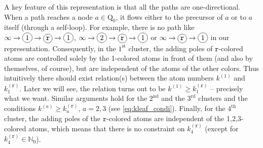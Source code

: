 \documentclass[12pt,a4paper]{article}
\renewcommand{\(}{\left(}
\renewcommand{\)}{\right)}
\newcommand*\circled[1]{\tikz[baseline=(char.base)]{
		\node[shape=circle,draw,inner sep=2pt] (char) {#1};}}
\renewcommand{\(}{\left(}
\renewcommand{\)}{\right)}
\begin{document}
A key feature of this representation is that all the paths are one-directional. 
When a path reaches a node $a\in \mathrm{Q}_0$, it flows either to the precursor of $a$ or to $a$ itself (through a self-loop). 
For example, there is no path like {\small $\infty\to \circled{1}\to \circled{\texttt{r}}\to\circled{1}$, $\infty\to \circled{2}\to \circled{\texttt{r}}\to\circled{1}$ }or {\small $\infty\to \circled{\texttt{r}}\to\circled{1}$} in our representation. 
Consequently, in the $1^{\textrm{st}}$ cluster, the adding poles of $\texttt{r}$-colored atoms are controlled solely by the 1-colored atoms in front of them (and also by themselves, of course), but are independent of the atoms of the other colors. 
Thus intuitively there should exist relation(s) between the atom numbers $k^{(1)}$ and $k^{(\texttt{r})}_1$.
Later we will see, the relation turns out to be $k^{(1)}\geq k^{(\texttt{r})}_1$ -- precisely what we want.
Similar arguments hold for the $2^{\textrm{nd}}$ and the $3^{\textrm{rd}}$ clusters and the conditions $k^{(a)}\geq k^{(\texttt{r})}_a$, $a=2,3$ (see \eqref{eq:kleaf_condi}). 
Finally, for the $4^{\textrm{th}}$ cluster, the adding poles of the $\texttt{r}$-colored atoms are independent of the 1,2,3-colored atoms, which means that there is no constraint on $k^{(\texttt{r})}_4$ (except for $k^{(\texttt{r})}_4\in\mathbb{N}_0$).

\medskip
\end{document}
